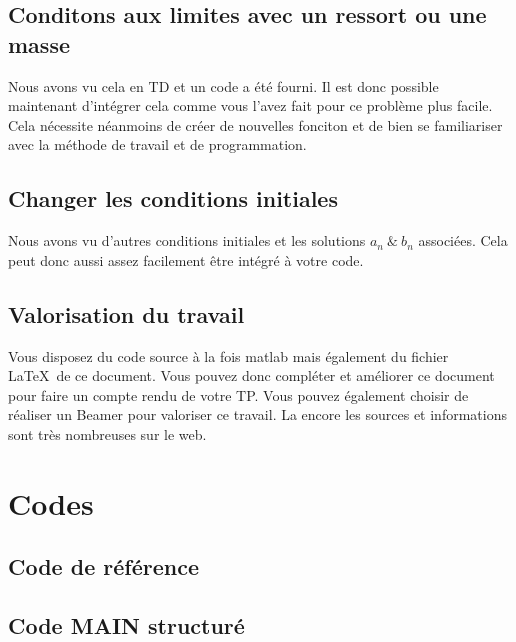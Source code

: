 \documentclass[a4paper,10pt]{article}
\begin{document}
\subsection{Conditons aux limites avec un ressort ou une masse}
Nous avons vu cela en TD et un code a été fourni. Il est donc possible maintenant d'intégrer cela comme vous l'avez fait pour ce problème plus facile. Cela nécessite néanmoins de créer de nouvelles fonciton et de bien se familiariser avec la méthode de travail et de programmation. 

\subsection{Changer les conditions initiales}
Nous avons vu d'autres conditions initiales et les solutions $a_n\ \&\  b_n$ associées. Cela peut donc aussi assez facilement être intégré à votre code. 




\subsection{Valorisation du travail}
Vous disposez du code source à la fois matlab mais également du fichier \LaTeX \ de ce document. Vous pouvez donc compléter et améliorer ce document pour faire un compte rendu de votre TP. Vous pouvez également choisir de réaliser un Beamer pour valoriser ce travail. La encore les sources et informations sont très nombreuses sur le web. 





\section{Codes}
\subsection{Code de référence}\label{sec:CodeDeReference}

\subsection{Code MAIN structuré}\label{sec:CodeMAIN}







\end{document}
